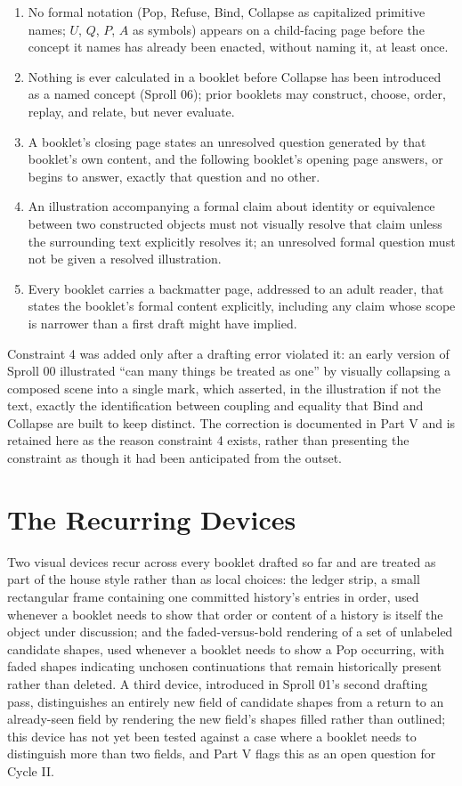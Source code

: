 \documentclass[11pt,twoside]{book}
\begin{document}
\begin{enumerate}
\item No formal notation (Pop, Refuse, Bind, Collapse as capitalized primitive names; $U$, $Q$, $P$, $A$ as symbols) appears on a child-facing page before the concept it names has already been enacted, without naming it, at least once.
\item Nothing is ever calculated in a booklet before Collapse has been introduced as a named concept (Sproll 06); prior booklets may construct, choose, order, replay, and relate, but never evaluate.
\item A booklet's closing page states an unresolved question generated by that booklet's own content, and the following booklet's opening page answers, or begins to answer, exactly that question and no other.
\item An illustration accompanying a formal claim about identity or equivalence between two constructed objects must not visually resolve that claim unless the surrounding text explicitly resolves it; an unresolved formal question must not be given a resolved illustration.
\item Every booklet carries a backmatter page, addressed to an adult reader, that states the booklet's formal content explicitly, including any claim whose scope is narrower than a first draft might have implied.
\end{enumerate}

Constraint 4 was added only after a drafting error violated it: an early version of Sproll 00 illustrated ``can many things be treated as one'' by visually collapsing a composed scene into a single mark, which asserted, in the illustration if not the text, exactly the identification between coupling and equality that Bind and Collapse are built to keep distinct. The correction is documented in Part V and is retained here as the reason constraint 4 exists, rather than presenting the constraint as though it had been anticipated from the outset.

\section{The Recurring Devices}

Two visual devices recur across every booklet drafted so far and are treated as part of the house style rather than as local choices: the ledger strip, a small rectangular frame containing one committed history's entries in order, used whenever a booklet needs to show that order or content of a history is itself the object under discussion; and the faded-versus-bold rendering of a set of unlabeled candidate shapes, used whenever a booklet needs to show a Pop occurring, with faded shapes indicating unchosen continuations that remain historically present rather than deleted. A third device, introduced in Sproll 01's second drafting pass, distinguishes an entirely new field of candidate shapes from a return to an already-seen field by rendering the new field's shapes filled rather than outlined; this device has not yet been tested against a case where a booklet needs to distinguish more than two fields, and Part V flags this as an open question for Cycle II.
\end{document}
